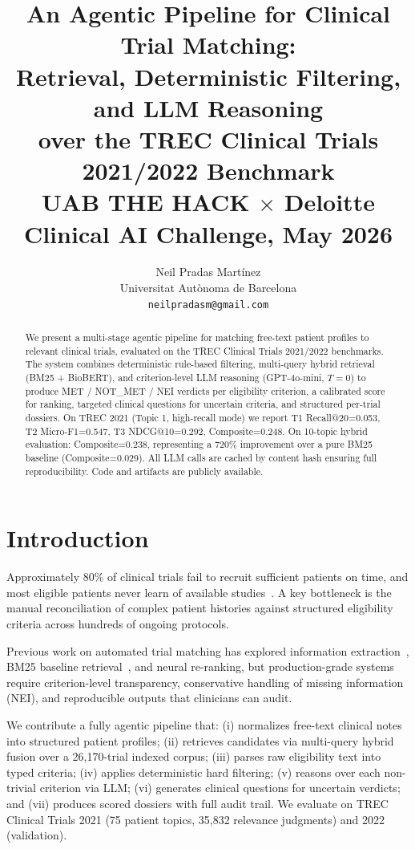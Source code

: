 \documentclass[10pt,twocolumn]{article}
\title{\textbf{An Agentic Pipeline for Clinical Trial Matching:\\
Retrieval, Deterministic Filtering, and LLM Reasoning\\
over the TREC Clinical Trials 2021/2022 Benchmark}\\[4pt]
\normalsize UAB THE HACK $\times$ Deloitte Clinical AI Challenge, May 2026}
\author{
  Neil Pradas Martínez\\
  Universitat Autònoma de Barcelona\\
  \texttt{neilpradasm@gmail.com}
}
\date{}
\begin{document}
\maketitle
\thispagestyle{empty}

\begin{abstract}
We present a multi-stage agentic pipeline for matching free-text patient profiles to
relevant clinical trials, evaluated on the TREC Clinical Trials 2021/2022 benchmarks.
The system combines deterministic rule-based filtering, multi-query hybrid retrieval
(BM25 + BioBERT), and criterion-level LLM reasoning (GPT-4o-mini, $T{=}0$) to produce
MET / NOT\_MET / NEI verdicts per eligibility criterion, a calibrated score for ranking,
targeted clinical questions for uncertain criteria, and structured per-trial dossiers.
On TREC 2021 (Topic 1, high-recall mode) we report T1 Recall@20=0.053, T2 Micro-F1=0.547,
T3 NDCG@10=0.292, Composite=0.248. On 10-topic hybrid evaluation: Composite=0.238,
representing a 720\% improvement over a pure BM25 baseline (Composite=0.029).
All LLM calls are cached by content hash ensuring full reproducibility. Code and
artifacts are publicly available.
\end{abstract}

\section{Introduction}

Approximately 80\% of clinical trials fail to recruit sufficient patients on time,
and most eligible patients never learn of available studies~\cite{clinicaltrials}.
A key bottleneck is the manual reconciliation of complex patient histories against
structured eligibility criteria across hundreds of ongoing protocols.

Previous work on automated trial matching has explored information extraction~\cite{trec2021},
BM25 baseline retrieval~\cite{robertson2009bm25}, and neural re-ranking, but production-grade
systems require criterion-level transparency, conservative handling of missing information
(NEI), and reproducible outputs that clinicians can audit.

We contribute a fully agentic pipeline that: (i) normalizes free-text clinical notes
into structured patient profiles; (ii) retrieves candidates via multi-query hybrid
fusion over a 26,170-trial indexed corpus; (iii) parses raw eligibility text into typed
criteria; (iv) applies deterministic hard filtering; (v) reasons over each non-trivial
criterion via LLM; (vi) generates clinical questions for uncertain verdicts; and
(vii) produces scored dossiers with full audit trail. We evaluate on TREC Clinical
Trials 2021 (75 patient topics, 35,832 relevance judgments) and 2022 (validation).
\end{document}
